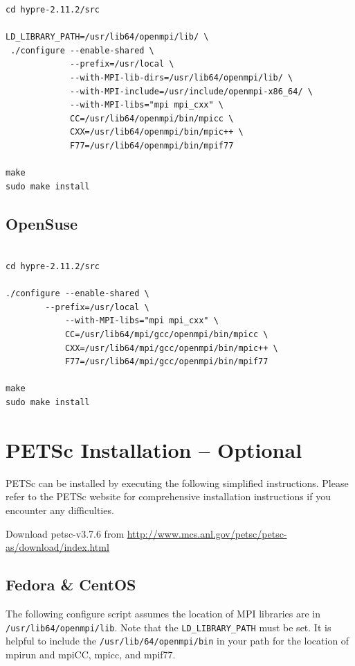 \documentclass[12pt]{article}
\begin{document}
\begin{verbatim}
cd hypre-2.11.2/src

LD_LIBRARY_PATH=/usr/lib64/openmpi/lib/ \
 ./configure --enable-shared \
             --prefix=/usr/local \
             --with-MPI-lib-dirs=/usr/lib64/openmpi/lib/ \
             --with-MPI-include=/usr/include/openmpi-x86_64/ \
             --with-MPI-libs="mpi mpi_cxx" \
             CC=/usr/lib64/openmpi/bin/mpicc \
             CXX=/usr/lib64/openmpi/bin/mpic++ \
             F77=/usr/lib64/openmpi/bin/mpif77

make
sudo make install

\end{verbatim}

\subsection{OpenSuse}
\label{hypre-opensuse}
\begin{verbatim}

cd hypre-2.11.2/src

./configure --enable-shared \
	    --prefix=/usr/local \
            --with-MPI-libs="mpi mpi_cxx" \
            CC=/usr/lib64/mpi/gcc/openmpi/bin/mpicc \
            CXX=/usr/lib64/mpi/gcc/openmpi/bin/mpic++ \
            F77=/usr/lib64/mpi/gcc/openmpi/bin/mpif77

make
sudo make install

\end{verbatim}


\section{PETSc Installation -- Optional}

PETSc can be installed by executing the following simplified
instructions.  Please refer to the PETSc website for comprehensive
installation instructions if you encounter any difficulties.

Download petsc-v3.7.6 from
\url{http://www.mcs.anl.gov/petsc/petsc-as/download/index.html}

\subsection{Fedora \& CentOS}
\label{petsc-fedora-centos}

The following configure script assumes the location of MPI libraries
are in \texttt{/usr/lib64/openmpi/lib}.  Note that the
\texttt{LD\_LIBRARY\_PATH} must be set.  It is helpful to include the
\texttt{/usr/lib/64/openmpi/bin} in your path for the location of
mpirun and mpiCC, mpicc, and mpif77.
\end{document}
